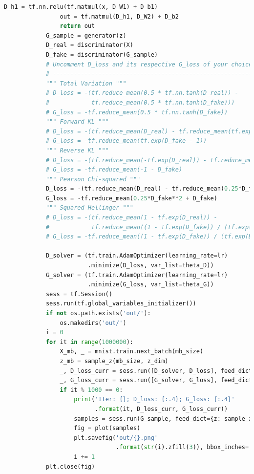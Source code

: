 \begin{lstlisting}[language = Python]
                D_h1 = tf.nn.relu(tf.matmul(x, D_W1) + D_b1)
                out = tf.matmul(D_h1, D_W2) + D_b2
                return out
            G_sample = generator(z)
            D_real = discriminator(X)
            D_fake = discriminator(G_sample)
            # Uncomment D_loss and its respective G_loss of your choice
            # ---------------------------------------------------------
            """ Total Variation """
            # D_loss = -(tf.reduce_mean(0.5 * tf.nn.tanh(D_real)) -
            #            tf.reduce_mean(0.5 * tf.nn.tanh(D_fake)))
            # G_loss = -tf.reduce_mean(0.5 * tf.nn.tanh(D_fake))
            """ Forward KL """
            # D_loss = -(tf.reduce_mean(D_real) - tf.reduce_mean(tf.exp(D_fake - 1)))
            # G_loss = -tf.reduce_mean(tf.exp(D_fake - 1))
            """ Reverse KL """
            # D_loss = -(tf.reduce_mean(-tf.exp(D_real)) - tf.reduce_mean(-1 - D_fake))
            # G_loss = -tf.reduce_mean(-1 - D_fake)
            """ Pearson Chi-squared """
            D_loss = -(tf.reduce_mean(D_real) - tf.reduce_mean(0.25*D_fake**2 + D_fake))
            G_loss = -tf.reduce_mean(0.25*D_fake**2 + D_fake)
            """ Squared Hellinger """
            # D_loss = -(tf.reduce_mean(1 - tf.exp(D_real)) -
            #            tf.reduce_mean((1 - tf.exp(D_fake)) / (tf.exp(D_fake))))
            # G_loss = -tf.reduce_mean((1 - tf.exp(D_fake)) / (tf.exp(D_fake)))

            D_solver = (tf.train.AdamOptimizer(learning_rate=lr)
                        .minimize(D_loss, var_list=theta_D))
            G_solver = (tf.train.AdamOptimizer(learning_rate=lr)
                        .minimize(G_loss, var_list=theta_G))
            sess = tf.Session()
            sess.run(tf.global_variables_initializer())
            if not os.path.exists('out/'):
                os.makedirs('out/')
            i = 0
            for it in range(1000000):
                X_mb, _ = mnist.train.next_batch(mb_size)
                z_mb = sample_z(mb_size, z_dim)
                _, D_loss_curr = sess.run([D_solver, D_loss], feed_dict={X: X_mb, z: z_mb})
                _, G_loss_curr = sess.run([G_solver, G_loss], feed_dict={z: z_mb})
                if it % 1000 == 0:
                    print('Iter: {}; D_loss: {:.4}; G_loss: {:.4}'
                          .format(it, D_loss_curr, G_loss_curr))
                    samples = sess.run(G_sample, feed_dict={z: sample_z(16, z_dim)})
                    fig = plot(samples)
                    plt.savefig('out/{}.png'
                                .format(str(i).zfill(3)), bbox_inches='tight')
                    i += 1
            plt.close(fig)
            \end{lstlisting}

